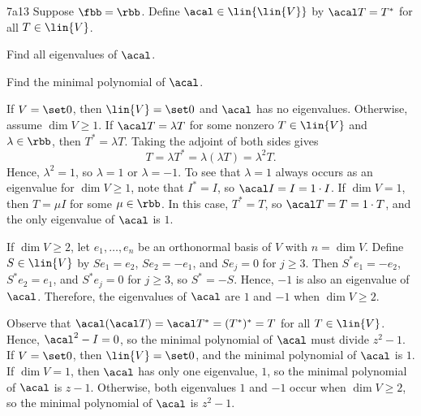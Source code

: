 \begin{exercise}{7a13}
    Suppose $\fbb = \rbb$.
    Define $\acal \in \lin{\lin{V}}$ by $\acal T = T^\ast$ for all $T \in \lin{V}$.
    \begin{subexercises}
        \item Find all eigenvalues of $\acal$.
        \item Find the minimal polynomial of $\acal$.
    \end{subexercises}
\end{exercise}

\begin{solenum}
    \item If $V = \set 0$, then $\lin{V} = \set 0$ and $\acal$ has no eigenvalues.
    Otherwise, assume $\dim V \geq 1$.
    If $\acal T = \lambda T$ for some nonzero $T \in \lin{V}$ and $\lambda \in \rbb$, then $T^\ast = \lambda T$.
    Taking the adjoint of both sides gives
    \[
        T = \lambda T^\ast = \lambda (\lambda T) = \lambda^2 T.
    \]
    Hence, $\lambda^2 = 1$, so $\lambda = 1$ or $\lambda = -1$.
    To see that $\lambda = 1$ always occurs as an eigenvalue for $\dim V \geq 1$, note that $I^\ast = I$, so $\acal I = I = 1 \cdot I$.
    If $\dim V = 1$, then $T = \mu I$ for some $\mu \in \rbb$.
    In this case, $T^\ast = T$, so $\acal T = T = 1 \cdot T$, and the only eigenvalue of $\acal$ is $1$.

    If $\dim V \geq 2$, let $e_1, \ldots, e_n$ be an orthonormal basis of $V$ with $n = \dim V$.
    Define $S \in \lin{V}$ by $S e_1 = e_2$, $S e_2 = -e_1$, and $S e_j = 0$ for $j \geq 3$.
    Then $S^\ast e_1 = -e_2$, $S^\ast e_2 = e_1$, and $S^\ast e_j = 0$ for $j \geq 3$, so $S^\ast = -S$.
    Hence, $-1$ is also an eigenvalue of $\acal$.
    Therefore, the eigenvalues of $\acal$ are $1$ and $-1$ when $\dim V \geq 2$.

    \item Observe that $\acal(\acal T) = \acal T^\ast = (T^\ast)^\ast = T$ for all $T \in \lin{V}$.
    Hence, $\acal^2 - I = 0$, so the minimal polynomial of $\acal$ must divide $z^2 - 1$.
    If $V = \set 0$, then $\lin{V} = \set 0$, and the minimal polynomial of $\acal$ is $1$.
    If $\dim V = 1$, then $\acal$ has only one eigenvalue, $1$, so the minimal polynomial of $\acal$ is $z - 1$.
    Otherwise, both eigenvalues $1$ and $-1$ occur when $\dim V \geq 2$, so the minimal polynomial of $\acal$ is $z^2 - 1$.
\end{solenum}

